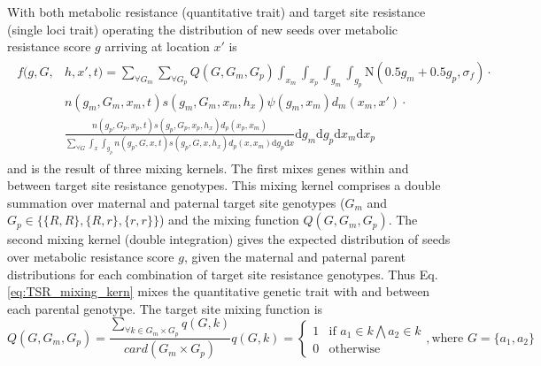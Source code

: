 \documentclass[12pt, a4paper]{article}
\begin{document}
With both metabolic resistance (quantitative trait) and target site resistance (single loci trait) operating the distribution of new seeds over metabolic resistance score $g$ arriving at location $x'$ is      
\begin{align}
\label{eq:fecund}
\begin{split}
	f(g, G, &h, x', t) = \displaystyle \sum_{\forall G_m}\sum_{\forall G_p} Q(G, G_m, G_p) \int_{x_m}\int_{x_p}\int_{g_m}\int_{g_p} \text{N}(0.5 g_m + 0.5 g_p, \sigma_f)\cdot\\
	&n(g_m, G_m, x_m, t)s(g_m, G_m, x_m, h_x)\psi(g_m, x_m)d_m(x_m, x')\cdot \\
	&\frac{n(g_p, G_p, x_p, t)s(g_p, G_p, x_p, h_x)d_p(x_p, x_m)}{\sum_{\forall G}\int_{x}\int_{g_p} n(g_p, G, x, t)s(g_p, G, x, h_x)d_p(x, x_m)\text{d}g_p\text{d}x} \text{d}g_m \text{d}g_p\text{d}x_m\text{d}x_p
\end{split}
\end{align}           
and is the result of three mixing kernels. The first mixes genes within and between target site resistance genotypes. This mixing kernel comprises a double summation over maternal and paternal target site genotypes ($G_m$ and $G_p \in \{\{R, R\}, \{R, r\}, \{r, r\} \}$) and the mixing function $Q(G, G_m, G_p)$. The second mixing kernel (double integration) gives the expected distribution of seeds over metabolic resistance score $g$, given the maternal and paternal parent distributions for each combination of target site resistance genotypes. Thus Eq. \ref{eq:TSR_mixing_kern} mixes the quantitative genetic trait with and between each parental genotype. The target site mixing function is
\begin{subequations}
\begin{equation}\label{eq:TSR_mixing_kern}
	Q(G, G_m, G_p) = \frac{\sum_{\forall k \in G_m \times G_p} q(G, k)}{card\left( G_m \times G_p \right)}
\end{equation}      
\begin{equation}\label{eq:allel_count}
	q(G, k) = \begin{cases}
		1 &\text{if } a_1 \in k \bigwedge a_2 \in k\\
		0 &\text{otherwise} 
	\end{cases}, \text{where } G = \{a_1, a_2\}
\end{equation} 
\end{subequations}
\end{document}
